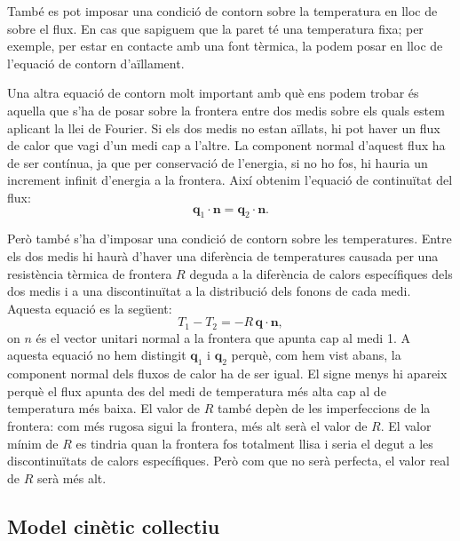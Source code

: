 \documentclass{article}
\begin{document}
Tamb\'{e} es pot imposar una condici\'{o} de contorn sobre la temperatura en lloc de sobre el flux. En cas que sapiguem que la paret t\'{e} una temperatura fixa; per exemple, per estar en contacte amb una font t\`{e}rmica, la podem posar en lloc de l'equaci\'{o} de contorn d'a\"{i}llament.

Una altra equaci\'{o} de contorn molt important amb qu\`{e} ens podem trobar \'{e}s aquella que s'ha de posar sobre la frontera entre dos medis sobre els quals estem aplicant la llei de Fourier. Si els dos medis no estan a\"{i}llats, hi pot haver un flux de calor que vagi d'un medi cap a l'altre. La component normal d'aquest flux ha de ser cont\'{i}nua, ja que per conservaci\'{o} de l'energia, si no ho fos, hi hauria un increment infinit d'energia a la frontera. Aix\'{i} obtenim l'equaci\'{o} de continu\"{i}tat del flux:
\begin{equation}\label{Equ.continuitat}
\boldsymbol{q}_1\cdot\boldsymbol{n}=\boldsymbol{q}_2\cdot\boldsymbol{n}.
\end{equation}

Per\`{o} tamb\'{e} s'ha d'imposar una condici\'{o} de contorn sobre les temperatures. Entre els dos medis hi haur\`{a} d'haver una difer\`{e}ncia de temperatures causada per una resist\`{e}ncia t\`{e}rmica de frontera $R$ deguda a la difer\`{e}ncia de calors espec\'{i}fiques dels dos medis i a una discontinu\"{i}tat a la distribuci\'{o} dels fonons de cada medi. Aquesta equaci\'{o} es la seg\"{u}ent:
\begin{equation}\label{Equ.resistencia}
T_1-T_2=-R\,\boldsymbol{q}\cdot\boldsymbol{n},
\end{equation}
on $n$ \'{e}s el vector unitari normal a la frontera que apunta cap al medi 1. A aquesta equaci\'{o} no hem distingit $\boldsymbol{q}_1$ i $\boldsymbol{q}_2$ perqu\`{e}, com hem vist abans, la component normal dels fluxos de calor ha de ser igual. El signe menys hi apareix perqu\`{e} el flux apunta des del medi de temperatura m\'{e}s alta cap al de temperatura m\'{e}s baixa. El valor de $R$ tamb\'{e} dep\`{e}n de les imperfeccions de la frontera: com m\'{e}s rugosa sigui la frontera, m\'{e}s alt ser\`{a} el valor de $R$. El valor m\'{i}nim de $R$ es tindria quan la frontera fos totalment llisa i seria el degut a les discontinu\"{i}tats de calors espec\'{i}fiques. Per\`{o} com que no ser\`{a} perfecta, el valor real de $R$ ser\`{a} m\'{e}s alt.

\subsection{Model cin\`{e}tic col\textperiodcentered lectiu}
\end{document}
